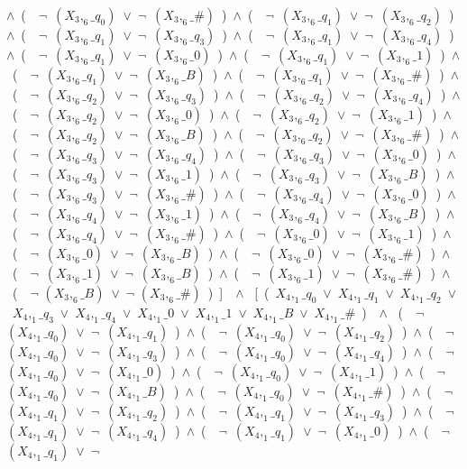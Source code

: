 ﻿\documentclass[a4paper,10pt]{article}
\begin{document}
$\wedge$\ (\ \ $\neg$\ $(X_3,_6\_q_0)$\ $\vee$\ $\neg$\ $(X_3,_6\_\#)$\ )\ $\wedge$\ (\ \ $\neg$\ $(X_3,_6\_q_1)$\ $\vee$\ $\neg$\ $(X_3,_6\_q_2)$\ )\ $\wedge$\ (\ \ $\neg$\ $(X_3,_6\_q_1)$\ $\vee$\ $\neg$\ $(X_3,_6\_q_3)$\ )\ $\wedge$\ (\ \ $\neg$\ $(X_3,_6\_q_1)$\ $\vee$\ $\neg$\ $(X_3,_6\_q_4)$\ )\ $\wedge$\ (\ \ $\neg$\ $(X_3,_6\_q_1)$\ $\vee$\ $\neg$\ $(X_3,_6\_0)$\ )\ $\wedge$\ (\ \ $\neg$\ $(X_3,_6\_q_1)$\ $\vee$\ $\neg$\ $(X_3,_6\_1)$\ )\ $\wedge$\ (\ \ $\neg$\ $(X_3,_6\_q_1)$\ $\vee$\ $\neg$\ $(X_3,_6\_B)$\ )\ $\wedge$\ (\ \ $\neg$\ $(X_3,_6\_q_1)$\ $\vee$\ $\neg$\ $(X_3,_6\_\#)$\ )\ $\wedge$\ (\ \ $\neg$\ $(X_3,_6\_q_2)$\ $\vee$\ $\neg$\ $(X_3,_6\_q_3)$\ )\ $\wedge$\ (\ \ $\neg$\ $(X_3,_6\_q_2)$\ $\vee$\ $\neg$\ $(X_3,_6\_q_4)$\ )\ $\wedge$\ (\ \ $\neg$\ $(X_3,_6\_q_2)$\ $\vee$\ $\neg$\ $(X_3,_6\_0)$\ )\ $\wedge$\ (\ \ $\neg$\ $(X_3,_6\_q_2)$\ $\vee$\ $\neg$\ $(X_3,_6\_1)$\ )\ $\wedge$\ (\ \ $\neg$\ $(X_3,_6\_q_2)$\ $\vee$\ $\neg$\ $(X_3,_6\_B)$\ )\ $\wedge$\ (\ \ $\neg$\ $(X_3,_6\_q_2)$\ $\vee$\ $\neg$\ $(X_3,_6\_\#)$\ )\ $\wedge$\ (\ \ $\neg$\ $(X_3,_6\_q_3)$\ $\vee$\ $\neg$\ $(X_3,_6\_q_4)$\ )\ $\wedge$\ (\ \ $\neg$\ $(X_3,_6\_q_3)$\ $\vee$\ $\neg$\ $(X_3,_6\_0)$\ )\ $\wedge$\ (\ \ $\neg$\ $(X_3,_6\_q_3)$\ $\vee$\ $\neg$\ $(X_3,_6\_1)$\ )\ $\wedge$\ (\ \ $\neg$\ $(X_3,_6\_q_3)$\ $\vee$\ $\neg$\ $(X_3,_6\_B)$\ )\ $\wedge$\ (\ \ $\neg$\ $(X_3,_6\_q_3)$\ $\vee$\ $\neg$\ $(X_3,_6\_\#)$\ )\ $\wedge$\ (\ \ $\neg$\ $(X_3,_6\_q_4)$\ $\vee$\ $\neg$\ $(X_3,_6\_0)$\ )\ $\wedge$\ (\ \ $\neg$\ $(X_3,_6\_q_4)$\ $\vee$\ $\neg$\ $(X_3,_6\_1)$\ )\ $\wedge$\ (\ \ $\neg$\ $(X_3,_6\_q_4)$\ $\vee$\ $\neg$\ $(X_3,_6\_B)$\ )\ $\wedge$\ (\ \ $\neg$\ $(X_3,_6\_q_4)$\ $\vee$\ $\neg$\ $(X_3,_6\_\#)$\ )\ $\wedge$\ (\ \ $\neg$\ $(X_3,_6\_0)$\ $\vee$\ $\neg$\ $(X_3,_6\_1)$\ )\ $\wedge$\ (\ \ $\neg$\ $(X_3,_6\_0)$\ $\vee$\ $\neg$\ $(X_3,_6\_B)$\ )\ $\wedge$\ (\ \ $\neg$\ $(X_3,_6\_0)$\ $\vee$\ $\neg$\ $(X_3,_6\_\#)$\ )\ $\wedge$\ (\ \ $\neg$\ $(X_3,_6\_1)$\ $\vee$\ $\neg$\ $(X_3,_6\_B)$\ )\ $\wedge$\ (\ \ $\neg$\ $(X_3,_6\_1)$\ $\vee$\ $\neg$\ $(X_3,_6\_\#)$\ )\ $\wedge$\ (\ \ $\neg$ $(X_3,_6\_B)$\ $\vee$\ $\neg$ $(X_3,_6\_\#)$\ )\ ]\ \ $\wedge$ \ [\ (\ $X_4,_1\_q_0$\ $\vee$\ $X_4,_1\_q_1$\ $\vee$\ $X_4,_1\_q_2$\ $\vee$\ $X_4,_1\_q_3$\ $\vee$\ $X_4,_1\_q_4$\ $\vee$\ $X_4,_1\_0$\ $\vee$\ $X_4,_1\_1$\ $\vee$\ $X_4,_1\_B$\ $\vee$\ $X_4,_1\_\#$\ )\ \ $\wedge$ \ (\ \ $\neg$\ $(X_4,_1\_q_0)$\ $\vee$\ $\neg$\ $(X_4,_1\_q_1)$\ )\ $\wedge$\ (\ \ $\neg$\ $(X_4,_1\_q_0)$\ $\vee$\ $\neg$\ $(X_4,_1\_q_2)$\ )\ $\wedge$\ (\ \ $\neg$\ $(X_4,_1\_q_0)$\ $\vee$\ $\neg$\ $(X_4,_1\_q_3)$\ )\ $\wedge$\ (\ \ $\neg$\ $(X_4,_1\_q_0)$\ $\vee$\ $\neg$\ $(X_4,_1\_q_4)$\ )\ $\wedge$\ (\ \ $\neg$\ $(X_4,_1\_q_0)$\ $\vee$\ $\neg$\ $(X_4,_1\_0)$\ )\ $\wedge$\ (\ \ $\neg$\ $(X_4,_1\_q_0)$\ $\vee$\ $\neg$\ $(X_4,_1\_1)$\ )\ $\wedge$\ (\ \ $\neg$\ $(X_4,_1\_q_0)$\ $\vee$\ $\neg$\ $(X_4,_1\_B)$\ )\ $\wedge$\ (\ \ $\neg$\ $(X_4,_1\_q_0)$\ $\vee$\ $\neg$\ $(X_4,_1\_\#)$\ )\ $\wedge$\ (\ \ $\neg$\ $(X_4,_1\_q_1)$\ $\vee$\ $\neg$\ $(X_4,_1\_q_2)$\ )\ $\wedge$\ (\ \ $\neg$\ $(X_4,_1\_q_1)$\ $\vee$\ $\neg$\ $(X_4,_1\_q_3)$\ )\ $\wedge$\ (\ \ $\neg$\ $(X_4,_1\_q_1)$\ $\vee$\ $\neg$\ $(X_4,_1\_q_4)$\ )\ $\wedge$\ (\ \ $\neg$\ $(X_4,_1\_q_1)$\ $\vee$\ $\neg$\ $(X_4,_1\_0)$\ )\ $\wedge$\ (\ \ $\neg$\ $(X_4,_1\_q_1)$\ $\vee$\ $\neg$\ 
\end{document}
